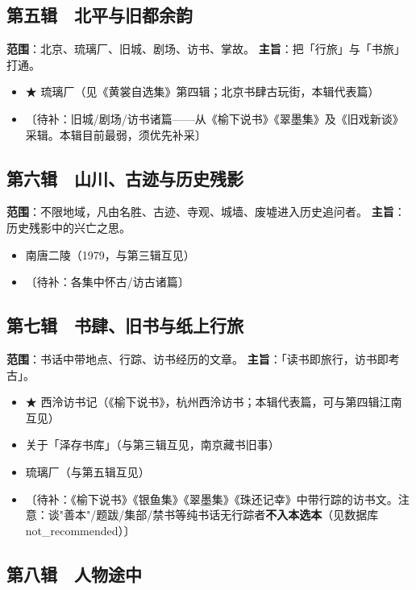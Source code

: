 \documentclass[UTF8,fontset=none,zihao=-4,a4paper]{ctexart}
\begin{document}
\subsection{第五辑　北平与旧都余韵}

\textbf{范围}：北京、琉璃厂、旧城、剧场、访书、掌故。 \textbf{主旨}：把「行旅」与「书旅」打通。


\begin{itemize}
\item ★ 琉璃厂（见《黄裳自选集》第四辑；北京书肆古玩街，本辑代表篇）
\item 〔待补：旧城/剧场/访书诸篇——从《榆下说书》《翠墨集》及《旧戏新谈》采辑。本辑目前最弱，须优先补采〕
\end{itemize}


\subsection{第六辑　山川、古迹与历史残影}

\textbf{范围}：不限地域，凡由名胜、古迹、寺观、城墙、废墟进入历史追问者。 \textbf{主旨}：历史残影中的兴亡之思。


\begin{itemize}
\item 南唐二陵（1979，与第三辑互见）
\item 〔待补：各集中怀古/访古诸篇〕
\end{itemize}


\subsection{第七辑　书肆、旧书与纸上行旅}

\textbf{范围}：书话中带地点、行踪、访书经历的文章。 \textbf{主旨}：「读书即旅行，访书即考古」。


\begin{itemize}
\item ★ 西泠访书记（《榆下说书》，杭州西泠访书；本辑代表篇，可与第四辑江南互见）
\item 关于「泽存书库」（与第三辑互见，南京藏书旧事）
\item 琉璃厂（与第五辑互见）
\item 〔待补：《榆下说书》《银鱼集》《翠墨集》《珠还记幸》中带行踪的访书文。注意：谈"善本"/题跋/集部/禁书等纯书话无行踪者\textbf{不入本选本}（见数据库 not\_recommended）〕
\end{itemize}


\subsection{第八辑　人物途中}
\end{document}
